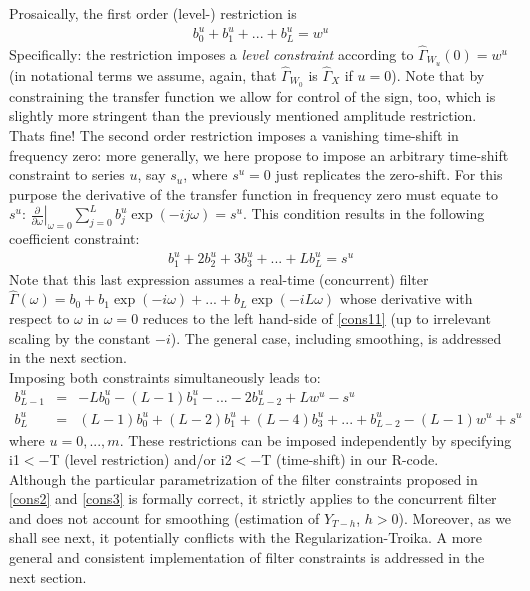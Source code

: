 \documentclass[11pt]{article}
\begin{document}
Prosaically, the first order (level-) restriction is
\begin{eqnarray}\label{cons1}
b_0^u+b_1^u+...+b_L^u=w^u
\end{eqnarray}
Specifically: the restriction imposes a \emph{level constraint} according to  $\hat{\Gamma}_{W_u}(0)=w^u$ (in notational terms we assume, again, that $\hat{\Gamma}_{W_0}$ is $\hat{\Gamma}_{X}$ if $u=0$). Note that by constraining the transfer function we allow for control of the sign, too, which is slightly more stringent than the previously mentioned  amplitude restriction. Thats fine! The second order restriction imposes  a vanishing time-shift in frequency zero: more generally, we  here propose to impose an arbitrary time-shift constraint to series $u$, say $s_u$, where $s^u=0$ just replicates the zero-shift. For this purpose the derivative of the transfer function in frequency zero must equate to $s^u$: $\left.\frac{\partial}{\partial \omega}\right|_{\omega=0}\sum_{j=0}^Lb_j^u\exp(-ij\omega)=s^u$. This condition results in the following coefficient constraint:
\begin{eqnarray}\label{cons11}
b_1^u+2b_2^u+3b_3^u+...+Lb_L^u=s^u
\end{eqnarray}
Note that this last expression assumes a real-time (concurrent) filter $\hat{\Gamma}(\omega)=b_0+b_1\exp(-i\omega)+...+b_L\exp(-iL\omega)$ whose derivative with respect to $\omega$ in $\omega=0$ reduces to the left hand-side of \ref{cons11} (up to irrelevant scaling by the constant $-i$). The general case, including smoothing, is addressed in the next section.\\ 

Imposing both constraints simultaneously leads to:
\begin{eqnarray}\label{cons2}
b_{L-1}^u&=&-Lb_0^u-(L-1)b_1^u-...-2b_{L-2}^u+Lw^u-s^u\\
b_{L}^u&=&(L-1)b_0^u+(L-2)b_1^u+(L-4)b_3^u+...+b_{L-2}^u-(L-1)w^u+s^u\label{cons3}
\end{eqnarray}
where $u=0,...,m$. These restrictions can be imposed independently by specifying i1$<-$T (level restriction) and/or i2$<-$T (time-shift) in our R-code. \\

Although the particular parametrization of the filter constraints proposed in \ref{cons2} and \ref{cons3} is formally correct, it strictly applies to the concurrent filter and does not account for smoothing (estimation of $Y_{T-h}$, $h>0$). Moreover, as we shall see next, it potentially conflicts with the Regularization-Troika. A more general and consistent implementation of filter constraints is addressed in the next section.
\end{document}
